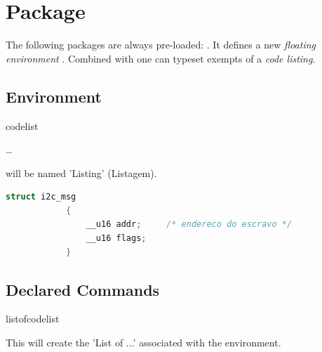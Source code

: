 \documentclass[article,nofontwarning,nogeometry,english,tocdepth=3,secdepth=3]{ufrgscca} %
\newif\iffulldoc
\begin{document}
\section{ Package}
The following packages are always pre-loaded: .
It defines a new \emph{floating environment} . Combined with  one can typeset exempts of a \emph{code listing}.

\subsection{Environment}
\begin{codedescribe}[env]{codelist}
	\begin{codesyntax}%
		\tsmacro{\begin{codelist}}{}\ldots \tsmacro{\end{codelist}}{}
	\end{codesyntax}
\tsmacro{\caption}{} will be named 'Listing' (Listagem).

\begin{codestore}[st=d.listing]
	\begin{codelist}[htbp]
		\caption{sample C code}
		\label{code01}
		\begin{lstlisting}[language=C]
			struct i2c_msg
			{
				__u16 addr;     /* endereco do escravo */
				__u16 flags;
			}
		\end{lstlisting}
		{\sourcecitation{\textcite{Garg:SMA-2000}}}
	\end{codelist}
\end{codestore}

\end{codedescribe}

\subsection{Declared Commands}
\begin{codedescribe}{listofcodelist}
	\begin{codesyntax}%
		\tsmacro{\listofcodelist}{}
	\end{codesyntax}
This will create the 'List of ...' associated with the  environment.
\end{codedescribe}

\iffulldoc
\end{document}
